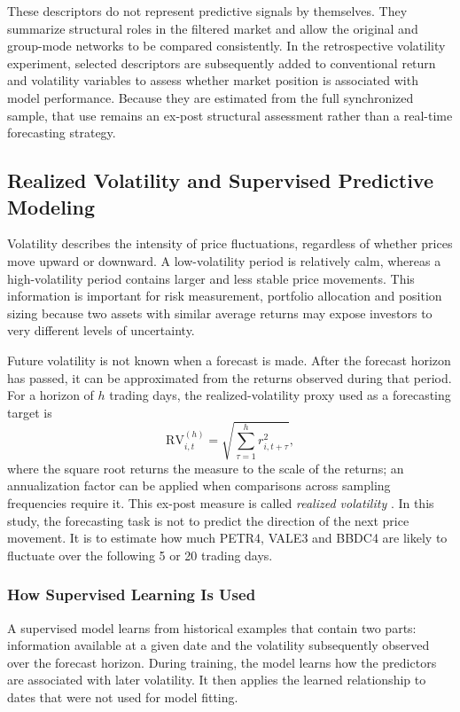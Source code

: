 These descriptors do not represent predictive signals by themselves. They summarize structural roles in the filtered market and allow the original and group-mode networks to be compared consistently. In the retrospective volatility experiment, selected descriptors are subsequently added to conventional return and volatility variables to assess whether market position is associated with model performance. Because they are estimated from the full synchronized sample, that use remains an ex-post structural assessment rather than a real-time forecasting strategy.

\subsection{Realized Volatility and Supervised Predictive Modeling}
\label{subsec:theory_volatility}

Volatility describes the intensity of price fluctuations, regardless of whether prices move upward or downward. A low-volatility period is relatively calm, whereas a high-volatility period contains larger and less stable price movements. This information is important for risk measurement, portfolio allocation and position sizing because two assets with similar average returns may expose investors to very different levels of uncertainty.

Future volatility is not known when a forecast is made. After the forecast horizon has passed, it can be approximated from the returns observed during that period. For a horizon of $h$ trading days, the realized-volatility proxy used as a forecasting target is
\begin{equation}
\mathrm{RV}_{i,t}^{(h)} = \sqrt{\sum_{\tau=1}^{h} r_{i,t+\tau}^{2}},
\label{eq:theory_rv}
\end{equation}
where the square root returns the measure to the scale of the returns; an annualization factor can be applied when comparisons across sampling frequencies require it. This ex-post measure is called \emph{realized volatility} \cite{andersen_2003_modeling}. In this study, the forecasting task is not to predict the direction of the next price movement. It is to estimate how much PETR4, VALE3 and BBDC4 are likely to fluctuate over the following 5 or 20 trading days.

\subsubsection{How Supervised Learning Is Used}
A supervised model learns from historical examples that contain two parts: information available at a given date and the volatility subsequently observed over the forecast horizon. During training, the model learns how the predictors are associated with later volatility. It then applies the learned relationship to dates that were not used for model fitting.

